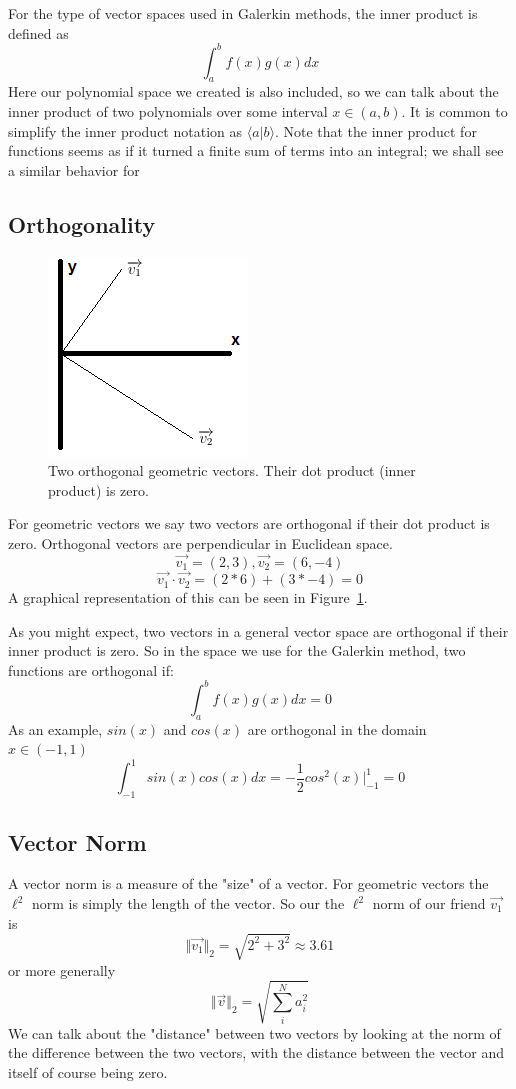 \documentclass[letterpaper,12pt]{article}
\newcommand{\be}{\begin{equation}}
\newcommand{\ee}{\end{equation}}
\begin{document}
For the type of vector spaces used in Galerkin methods, the inner product is defined as
\be \int_a^b f(x)g(x) dx \ee
Here our polynomial space we created is also included, so we can talk about the inner product of two polynomials over some interval $x \in (a,b)$. It is common to simplify the inner product notation as $\langle a | b \rangle$. Note that the inner product for functions seems as if it turned a finite sum of terms into an integral; we shall see a similar behavior for 
\subsection{Orthogonality}
\begin{figure}
\centering
\includegraphics{OrthoVect.PNG}
\caption{\label{fig:OrthoVect}Two orthogonal geometric vectors. Their dot product (inner product) is zero.}
\end{figure}

For geometric vectors we say two vectors are orthogonal if their dot product is zero. Orthogonal vectors are perpendicular in Euclidean space.
\be \overrightarrow{v_1}=(2,3), \overrightarrow{v_2}=(6,-4) \ee
\be \overrightarrow{v_1} \cdot \overrightarrow{v_2} = (2*6) + (3*-4) = 0 \ee
A graphical representation of this can be seen in Figure~\ref{fig:OrthoVect}.

As you might expect, two vectors in a general vector space are orthogonal if their inner product is zero. So in the space we use for the Galerkin method, two functions are orthogonal if:
\be \int_a^b f(x)g(x) dx =0 \ee
As an example, $sin(x)$ and $cos(x)$ are orthogonal in the domain $x \in (-1, 1)$
\be \int_{-1}^1 sin(x)cos(x) dx = -\frac{1}{2} cos^2(x)\Big\rvert_{-1}^{1} = 0\ee
\subsection{Vector Norm}
A vector norm is a measure of the "size" of a vector. For geometric vectors the $\ell^2$ norm is simply the length of the vector. So our the $\ell^2$ norm of our friend $\overrightarrow{v_1}$ is  
\be \Vert\overrightarrow{v_1}\Vert_2 = \sqrt{2^2+3^2} \approx 3.61 \ee
or more generally
\be \Vert\overrightarrow{v}\Vert_2 = \sqrt{\sum_i^N a_i^2} \ee
We can talk about the "distance" between two vectors by looking at the norm of the difference between the two vectors, with the distance between the vector and itself of course being zero.
\end{document}
